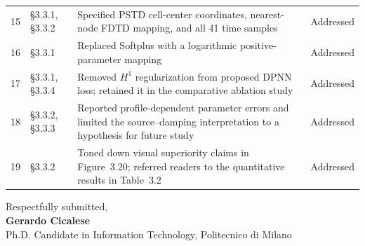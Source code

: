 \documentclass[11pt,a4paper]{article}
\begin{document}
\begin{table}[ht]
\begin{tabular}{@{}llp{8.0cm}l@{}}
15 & \S3.3.1, \S3.3.2 & Specified PSTD cell-center coordinates, nearest-node FDTD mapping, and all 41 time samples & Addressed \\
16 & \S3.3.1 & Replaced Softplus with a logarithmic positive-parameter mapping & Addressed \\
17 & \S3.3.1, \S3.3.4 & Removed $H^1$ regularization from proposed DPNN loss; retained it in the comparative ablation study & Addressed \\
18 & \S3.3.2, \S3.3.3 & Reported profile-dependent parameter errors and limited the source--damping interpretation to a hypothesis for future study & Addressed \\
19 & \S3.3.2 & Toned down visual superiority claims in Figure~3.20; referred readers to the quantitative results in Table~3.2 & Addressed \\
\bottomrule
\end{tabular}
\end{table}

\vspace{1cm}
\noindent Respectfully submitted,\\[1em]
\textbf{Gerardo Cicalese}\\
Ph.D. Candidate in Information Technology, Politecnico di Milano

\newpage


\end{document}
